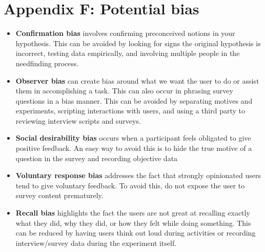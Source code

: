 \section{Appendix F: Potential bias}

\begin{itemize}
\item
  \textbf{Confirmation bias} involves confirming preconceived notions in your hypothesis. This can be avoided by looking for signs the original hypothesis is incorrect, testing data empirically, and involving multiple people in the needfinding process.
\item
  \textbf{Observer bias} can create bias around what we want the user to do or assist them in accomplishing a task. This can also occur in phrasing survey questions in a bias manner. This can be avoided by separating motives and experiments, scripting interactions with users, and using a third party to reviewing interview scripts and surveys.
\item
  \textbf{Social desirability bias} occurs when a participant feels obligated to give positive feedback. An easy way to avoid this is to hide the true motive of a question in the survey and recording objective data
\item
  \textbf{Voluntary response bias} addresses the fact that strongly opinionated users tend to give voluntary feedback. To avoid this, do not expose the user to survey content prematurely.
\item
  \textbf{Recall bias} highlights the fact the users are not great at recalling exactly what they did, why they did, or how they felt while doing something. This can be reduced by having users think out loud during activities or recording interview/survey data during the experiment itself.
\end{itemize}




